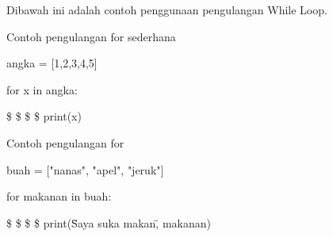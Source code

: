 \vspace{\baselineskip}
Dibawah ini adalah contoh penggunaan pengulangan While Loop. \par
\noindent 
\vspace{\baselineskip}
\vspace{12pt}
\noindent 
Contoh pengulangan for sederhana \par
\noindent 
\vspace{\baselineskip}
angka = [1,2,3,4,5] \par
\noindent 
\vspace{\baselineskip}
for x in angka: \par
\noindent 
\vspace{\baselineskip}
 \$  \$  \$  \$ print(x) \par
\noindent 
\vspace{\baselineskip}
\vspace{\baselineskip}
Contoh pengulangan for \par
\noindent 
\vspace{\baselineskip}
buah = ["nanas", "apel", "jeruk"] \par
\noindent 
\vspace{\baselineskip}
for makanan in buah: \par
\noindent 
\vspace{\baselineskip}
 \$  \$  \$  \$ print(\"Saya suka makan\", makanan) \par
\noindent 
\vspace{\baselineskip}
\vspace{\baselineskip}
\vspace{12pt}
\noindent 
